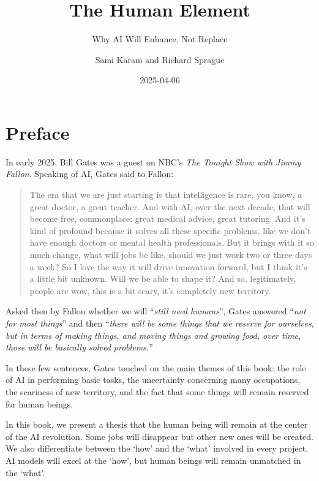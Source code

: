 \documentclass[
  Letterpaper,
]{scrbook}
\title{The Human Element}
\subtitle{Why AI Will Enhance, Not Replace}
\author{Sami Karam and Richard Sprague}
\date{2025-04-06}
\renewcommand*\contentsname{Table of contents}
\newcommand\contentsname{Table of contents}
\begin{document}
\frontmatter
\maketitle

\renewcommand*\contentsname{Table of contents}
{
\setcounter{tocdepth}{2}
\tableofcontents
}

\mainmatter
{}

\chapter*{Preface}\label{preface}


In early 2025, Bill Gates was a guest on NBC's \emph{The Tonight Show
with Jimmy Fallon}. Speaking of AI, Gates said to Fallon:

\begin{quote}
The era that we are just starting is that intelligence is rare, you
know, a great doctor, a great teacher. And with AI, over the next
decade, that will become free, commonplace: great medical advice, great
tutoring. And it's kind of profound because it solves all these specific
problems, like we don't have enough doctors or mental health
professionals. But it brings with it so much change, what will jobs be
like, should we just work two or three days a week? So I love the way it
will drive innovation forward, but I think it's a little bit unknown.
Will we be able to shape it? And so, legitimately, people are wow, this
is a bit scary, it's completely new territory.
\end{quote}

Asked then by Fallon whether we will ``\emph{still need humans}'', Gates
answered ``\emph{not for most things}'' and then ``\emph{there will be
some things that we reserve for ourselves, but in terms of making
things, and moving things and growing food, over time, those will be
basically solved problems.}''

In these few sentences, Gates touched on the main themes of this book:
the role of AI in performing basic tasks, the uncertainty concerning
many occupations, the scariness of new territory, and the fact that some
things will remain reserved for human beings.

In this book, we present a thesis that the human being will remain at
the center of the AI revolution. Some jobs will disappear but other new
ones will be created. We also differentiate between the `how' and the
`what' involved in every project. AI models will excel at the `how', but
human beings will remain unmatched in the `what'.
\end{document}
